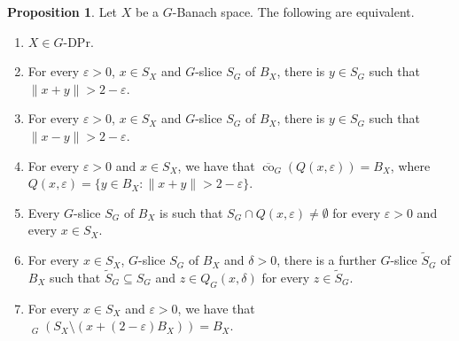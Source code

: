 \documentclass[a4paper,12pt]{amsart}
\theoremstyle{definition}
\newtheorem{proposition}[theorem]{Proposition}
\theoremstyle{definition}
\theoremstyle{remark}
\numberwithin{equation}{section}
\newcommand{\clco}{\mathop{\overline{\mathrm{co}}}\nolimits}
\DeclareMathOperator{\co}{co}
\newcommand{\<}{\langle}
\renewcommand{\>}{\rangle}
\newcommand{\e}{\varepsilon}
\newcommand{\eps}{\e}
\begin{document}
	
	\begin{proposition} \label{prop:characterization-G-DP} Let $X$ be a $G$-Banach space. The following are equivalent.
		\begin{enumerate}
			\item $X \in G$-DPr.
			\item For every $\e>0$, $x \in S_X$ and $G$-slice $S_G$ of $B_X$, there is $y \in S_G$ such that $\|x+y\| > 2 -\e$.
			\item For every $\e>0$, $x \in S_X$ and $G$-slice $S_G$ of $B_X$, there is $y \in S_G$ such that $\|x-y\| > 2 -\e$.
			\item For every $\e>0$ and $x \in S_X$, we have that $\overline{\co}_G(Q(x,\e)) = B_X$, where $Q(x,\e) = \{y \in B_X: \|x+y\| > 2 - \e\}$.
			\item Every $G$-slice $S_G$ of $B_X$ is such that $S_G \cap Q(x, \e) \not= \emptyset$ for every $\e>0$ and every $x \in S_X$.
			\item For every $x \in S_X$, $G$-slice $S_G$ of $B_X$ and $\delta>0$, there is a further $G$-slice $\tilde{S}_G$ of $B_X$ such that $\tilde{S}_G \subseteq S_G$ and $z \in Q_G(x, \delta)$ for every $z \in \tilde{S}_G$.
			\item For every $x \in S_X$ and $\eps > 0$, we have that $\clco_G(S_X \setminus (x + (2-\eps) B_X)) = B_X$.
		\end{enumerate}
	\end{proposition}
	
\end{document}
